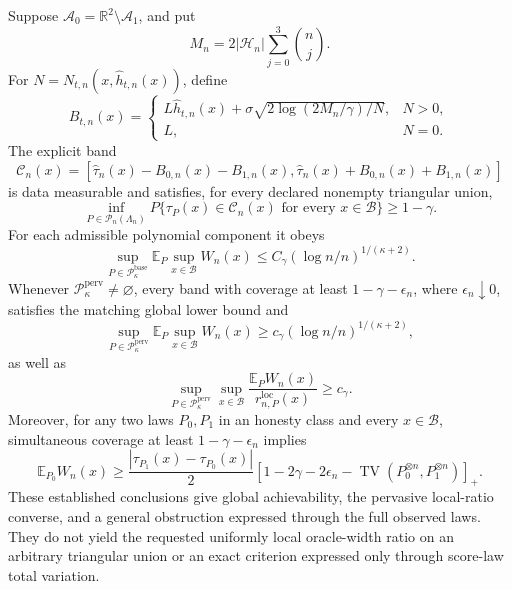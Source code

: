 Suppose \(\mathcal A_0=\mathbb R^2\setminus\mathcal A_1\), and put
\[
 M_n=2|\mathcal H_n|\sum_{j=0}^3\binom nj.
\]
For \(N=N_{t,n}(x,\widehat h_{t,n}(x))\), define
\[
 B_{t,n}(x)=
 \begin{cases}
 L\widehat h_{t,n}(x)+\sigma\sqrt{2\log(2M_n/\gamma)/N},&N>0,\\
 L,&N=0.
 \end{cases}
\]
The explicit band
\[
 \mathcal C_n(x)=
 \left[
 \widehat\tau_n(x)-B_{0,n}(x)-B_{1,n}(x),
 \widehat\tau_n(x)+B_{0,n}(x)+B_{1,n}(x)
 \right]
\]
is data measurable and satisfies, for every declared nonempty triangular union,
\[
 \inf_{P\in\mathcal P_n(\Lambda_n)}
 P\{\tau_P(x)\in\mathcal C_n(x)\text{ for every }x\in\mathcal B\}
 \ge 1-\gamma.
\]
For each admissible polynomial component it obeys
\[
 \sup_{P\in\mathcal P_{\kappa}^{\mathrm{base}}}
 \mathbb E_P\sup_{x\in\mathcal B}W_n(x)
 \le C_\gamma(\log n/n)^{1/(\kappa+2)}.
\]
Whenever \(\mathcal P_{\kappa}^{\mathrm{perv}}\ne\varnothing\), every band with coverage at least \(1-\gamma-\epsilon_n\), where \(\epsilon_n\downarrow0\), satisfies the matching global lower bound and
\[
 \sup_{P\in\mathcal P_{\kappa}^{\mathrm{perv}}}
 \mathbb E_P\sup_{x\in\mathcal B}W_n(x)
 \ge c_\gamma(\log n/n)^{1/(\kappa+2)},
\]
as well as
\[
 \sup_{P\in\mathcal P_{\kappa}^{\mathrm{perv}}}
 \sup_{x\in\mathcal B}
 \frac{\mathbb E_PW_n(x)}{r_{n,P}^{\mathrm{loc}}(x)}
 \ge c_\gamma.
\]
Moreover, for any two laws \(P_0,P_1\) in an honesty class and every \(x\in\mathcal B\), simultaneous coverage at least \(1-\gamma-\epsilon_n\) implies
\[
 \mathbb E_{P_0}W_n(x)
 \ge
 \frac{|\tau_{P_1}(x)-\tau_{P_0}(x)|}{2}
 \left[
 1-2\gamma-2\epsilon_n-
 \operatorname{TV}(P_0^{\otimes n},P_1^{\otimes n})
 \right]_+.
\]
These established conclusions give global achievability, the pervasive local-ratio converse, and a general obstruction expressed through the full observed laws. They do not yield the requested uniformly local oracle-width ratio on an arbitrary triangular union or an exact criterion expressed only through score-law total variation.